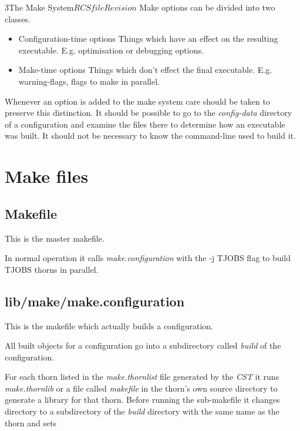 \begin{cactuspart}{3}{The Make System}{$RCSfile$}{$Revision$}
Make options can be divided into two classes.

\begin{itemize}
\item{Configuration-time options}
Things which have an effect on the resulting executable. 
E.g. optimisation or debugging options.
\item{Make-time options}
Things which don't effect the final executable.
E.g. warning-flags, flags to make in parallel.
\end{itemize}

Whenever an option is added to the make system care should be taken
to preserve this distinction.  It should be possible to go to the
{\em config-data} directory of a configuration and examine the files
there to determine how an executable was built.  It should not be
necessary to know the command-line used to build it.


\chapter{Make files}
\label{ch:makefiles}

\section{Makefile}
\label{sec:makefiles:Makefile}

This is the master makefile.  

In normal operation it calls {\em make.configuration} with the
-j TJOBS flag to build TJOBS thorns in parallel.

\section{lib/make/make.configuration}
\label{sec:makefiles:configuration}

This is the makefile which actually builds a configuration.

All built objects for a configuration go into a subdirectory called
{\em build} of the configuration.

For each thorn listed in the {\em make.thornlist} file generated
by the {\em CST} it runs {\em make.thornlib} or a file called {\em makefile} 
in the thorn's own source directory to generate a library for
that thorn.  Before running the sub-makefile it changes directory to a subdirectory
of the {\em build} directory with the same name as the thorn and sets


\end{cactuspart}
